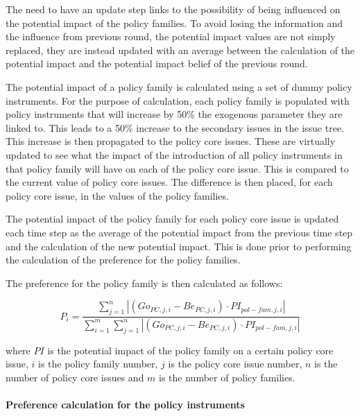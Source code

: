 \documentclass[11pt]{article}
\begin{document}
The need to have an update step links to the possibility of being influenced on the potential impact of the policy families. To avoid losing the information and the influence from previous round, the potential impact values are not simply replaced, they are instead updated with an average between the calculation of the potential impact and the potential impact belief of the previous round.

The potential impact of a policy family is calculated using a set of dummy policy instruments. For the purpose of calculation, each policy family is populated with policy instruments that will increase by 50\% the exogenous parameter they are linked to. This leads to a 50\% increase to the secondary issues in the issue tree. This increase is then propagated to the policy core issues. These are virtually updated to see what the impact of the introduction of all policy instruments in that policy family will have on each of the policy core issue. This is compared to the current value of policy core issues. The difference is then placed, for each policy core issue, in the values of the policy families.

The potential impact of the policy family for each policy core issue is updated each time step as the average of the potential impact from the previous time step and the calculation of the new potential impact. This is done prior to performing the calculation of the preference for the policy families.

The preference for the policy family is then calculated as follows:

\begin{equation}
P_i = \frac{ \sum_{j=1}^{n} \left| \left(Go_{PC,j,i} - Be_{PC,j,i} \right) \cdot PI_{pol-fam,j,i} \right| }{ \sum_{i=1}^{m}  \sum_{j=1}^{n} \left| \left(Go_{PC,j,i} - Be_{PC,j,i} \right) \cdot PI_{pol-fam,j,i} \right|}
\end{equation}

where $PI$ is the potential impact of the policy family on a certain policy core issue, $i$ is the policy family number, $j$ is the policy core issue number, $n$ is the number of policy core issues and $m$ is the number of  policy families.

\paragraph{Preference calculation for the policy instruments}
\label{sssec:prefCalcPolicyIns}
\end{document}
